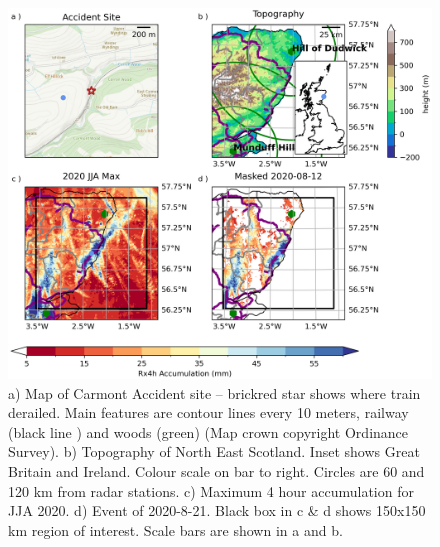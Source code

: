 \documentclass[11pt,a4paper]{article}
\begin{document}
\begin{figure}[tp]
	
	\centering
	\includegraphics[width=\linewidth]{carmont_geog_group.png}
	\caption{a) Map of Carmont Accident site -- brickred star shows where train derailed. Main features are contour lines every 10 meters, railway (black line ) and woods (green) (Map crown copyright Ordinance Survey). b) Topography of North East Scotland. Inset shows Great Britain and Ireland. Colour scale on bar to right. Circles are  60 and 120 km from radar stations.  c) Maximum 4 hour accumulation  for JJA 2020. d) Event of 2020-8-21.  Black box in c \& d shows 150x150 km region of interest. Scale bars are shown in a and b.   }
	\label{fig:carmont_geog_group}
\end{figure}
\end{document}

